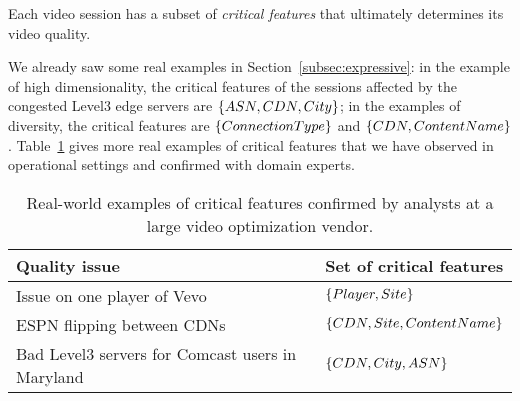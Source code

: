 \begin{insight}
Each video session has a subset of {\em critical features} that ultimately determines its video quality.
\end{insight}

We already saw some real examples in 
Section~\ref{subsec:expressive}:
in the example of high dimensionality, the critical features 
of the sessions affected by the congested Level3 edge 
servers are $\{ASN, CDN, City\}$;
in the examples of diversity, the critical features are
$\{ConnectionType\}$ and $\{CDN,ContentName\}$.
Table~\ref{tab:bottleneck} gives more real examples 
of critical features that we have observed in operational 
settings and confirmed with domain experts.


\begin{table}[t!]
    \begin{tabular}{p{}|p{2in}}
    {\bf Quality issue} & {\bf Set of critical features} \\ \hline\hline

     Issue on one player of Vevo & $\{Player,Site\}$ \\ \hline
     ESPN flipping between CDNs  & $\{CDN,Site,ContentName\}$ \\ \hline
     Bad Level3 servers for Comcast users in Maryland& $\{CDN,City,ASN\}$ \\
    \end{tabular}
\caption{Real-world examples of critical features confirmed 
by analysts at a large video optimization vendor.}
\label{tab:bottleneck}
\end{table}


